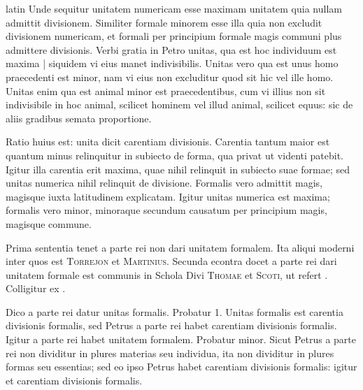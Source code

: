 \begin{otherlanguage*}{latin}
\pstart
Unde sequitur unitatem numericam esse maximam unitatem quia nullam admittit divisionem. Similiter formale minorem esse illa quia non excludit divisionem numericam, et  formali per principium formale magis communi plus admittere divisionis. Verbi gratia in Petro unitas, qua est hoc individuum est maxima \textnormal{|} siquidem vi eius manet indivisibilis. Unitas vero qua est unus homo praecedenti est minor, nam vi eius non excluditur quod sit hic vel ille homo. Unitas enim qua est animal minor est praecedentibus, cum vi illius non sit indivisibile in hoc animal, scilicet hominem vel illud animal, scilicet equus:
sic de aliis gradibus semata proportione. 
\pend

\pstart
Ratio huius est:
unita dicit carentiam divisionis. Carentia tantum maior est quantum minus relinquitur in subiecto de forma, qua privat ut videnti patebit. Igitur illa carentia erit maxima, quae nihil relinquit in subiecto suae formae; sed unitas numerica nihil relinquit de divisione. Formalis vero admittit magis, magisque iuxta latitudinem explicatam. Igitur unitas numerica est maxima; formalis vero minor, minoraque secundum causatum per principium magis, magisque commune. 
\pend

\pstart
Prima sententia tenet a parte rei non dari unitatem formalem. Ita aliqui moderni inter quos est \textsc{Torrejon} et \textsc{Martinius}. Secunda econtra docet a parte rei dari unitatem formale est communis in Schola Divi \textsc{Thomae} et \textsc{Scoti}, ut refert . Colligitur ex . 
\pend

\pstart
Dico a parte rei datur unitas formalis. Probatur 1. Unitas formalis est carentia divisionis formalis, sed Petrus a parte rei habet carentiam divisionis formalis. Igitur a parte rei habet unitatem formalem. Probatur minor. Sicut Petrus a parte rei non dividitur in plures materias seu individua, ita non dividitur in plures formas seu essentias; sed eo ipso Petrus habet carentiam divisionis formalis:
igitur et carentiam divisionis formalis. 
\pend


\end{otherlanguage*}
